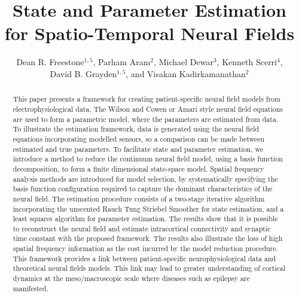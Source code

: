 \documentclass[10pt,a4paper]{article}
\begin{document}
\title{State and Parameter Estimation for Spatio-Temporal Neural Fields}

\author{Dean R. Freestone$^{1,5}$, Parham Aram$^2$, Michael Dewar$^3$, Kenneth Scerri$^4$, \\David B. Grayden$^{1,5}$, and Visakan Kadirkamanathan$^2$}


\maketitle

\begin{abstract}
	This paper presents a framework for creating patient-specific neural field models from electrophysiological data. The Wilson and Cowen or Amari style neural field equations are used to form a parametric model, where the parameters are estimated from data. To illustrate the estimation framework, data is generated using the neural field equations incorporating modelled sensors, so a comparison can be made between estimated and true parameters. To facilitate state and parameter estimation, we introduce a method to reduce the continuum neural field model, using a basis function decomposition, to form a finite dimensional state-space model. Spatial frequency analysis methods are introduced for model selection, by systematically specifying the basis function configuration required to capture the dominant characteristics of the neural field. The estimation procedure consists of a two-stage iterative algorithm incorporating the unscented Rauch Tung Striebel Smoother for state estimation, and a least squares algorithm for parameter estimation. The results show that it is possible to reconstruct the neural field and estimate intracortical connectivity and synaptic time constant with the proposed framework. The results also illustrate the loss of high spatial frequency information as the cost incurred by the model reduction procedure. This framework provides a link between patient-specific neurophysiological data and theoretical neural fields models. This link may lead to greater understanding of cortical dynamics at the meso/macroscopic scale where diseases such as epilepsy are manifested.   
\end{abstract}
\end{document}
